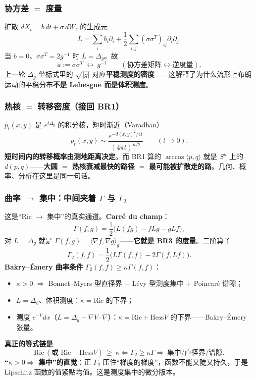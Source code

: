 \subsubsection{协方差 $=$ 度量}

扩散 $dX_t=b\,dt+\sigma\,dW_t$ 的生成元
\[
L=\sum_ib_i\partial_i+\frac12\sum_{i,j}(\sigma\sigma^T)_{ij}\partial_i\partial_j .
\]
当 $b=0$、$\sigma\sigma^T=2g^{-1}$ 时 $L=\Delta_g$。故
\[
a:=\sigma\sigma^T\ \longleftrightarrow\ g^{-1}
\qquad(\text{协方差矩阵}\leftrightarrow\text{逆度量}).
\]
上一轮 $\Delta_g$ 坐标式里的 $\sqrt{|g|}$ 对应\textbf{平稳测度的密度}——这解释了为什么流形上布朗运动的平稳分布\textbf{不是 Lebesgue 而是体积测度}。

\subsubsection{热核 $=$ 转移密度（接回 BR1）}

$p_t(x,y)$ 是 $e^{t\Delta_g}$ 的积分核，短时渐近（Varadhan）
\[
p_t(x,y)\sim\frac{e^{-d(x,y)^2/4t}}{(4\pi t)^{n/2}}\qquad(t\to0).
\]
\textbf{短时间内的转移概率由测地距离决定}。而 BR1 算的 $\arccos\langle p,q\rangle$ 就是 $S^n$ 上的 $d(p,q)$——\textbf{大圆 $=$ 热核衰减最快的路径 $=$ 最可能被扩散走的路}。几何、概率、分析在这里是同一句话。

\subsubsection{曲率 $\to$ 集中：中间夹着 $\Gamma$ 与 $\Gamma_2$}

这是“Ric $\to$ 集中”的真实通道。\textbf{Carr\'e du champ}：
\[
\Gamma(f,g)=\frac12\big(L(fg)-fLg-gLf\big),
\]
对 $L=\Delta_g$ 就是 $\Gamma(f,g)=\langle\nabla f,\nabla g\rangle_g$——\textbf{它就是 BR3 的度量}。二阶算子
\[
\Gamma_2(f,f)=\frac12\big(L\Gamma(f,f)-2\Gamma(f,Lf)\big).
\]
\textbf{Bakry--\'Emery 曲率条件} $\Gamma_2(f,f)\ge\kappa\Gamma(f,f)$：

\begin{itemize}
  \item $\kappa>0$ $\Rightarrow$ Bonnet--Myers 型直径界 $+$ L\'evy 型测度集中 $+$ Poincar\'e 谱隙；
  \item $L=\Delta_g$、体积测度：$\kappa=\mathrm{Ric}$ 的下界；
  \item 测度 $e^{-V}dx$（$L=\Delta_g-\nabla V\cdot\nabla$）：$\kappa=\mathrm{Ric}+\mathrm{Hess}V$ 的下界——Bakry--\'Emery 张量。
\end{itemize}

\textbf{真正的等式链是}
\[
\mathrm{Ric}\ (\text{或 }\mathrm{Ric}+\mathrm{Hess}V)\ \ge\ \kappa
\iff\Gamma_2\ge\kappa\Gamma
\Longrightarrow\ \text{集中/直径界/谱隙}.
\]
\textbf{“$\kappa>0\Rightarrow$ 集中”的直觉}：正 $\Gamma_2$ 压住“梯度的梯度”，函数不能又陡又持久，于是 Lipschitz 函数的值紧贴均值。这是测度集中的微分版本。

